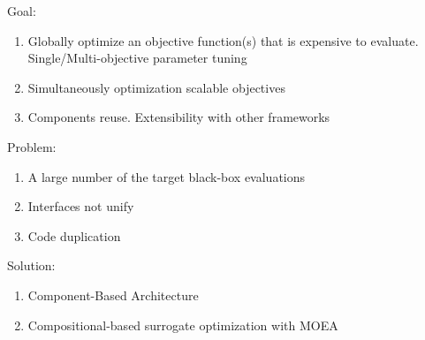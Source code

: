         Goal:
        \begin{enumerate}
            \item Globally optimize an objective function(s) that is expensive to evaluate. Single/Multi-objective parameter tuning
            \item Simultaneously optimization scalable objectives
            \item Components reuse. Extensibility with other frameworks
        \end{enumerate}

        Problem:
        \begin{enumerate}
            \item A large number of the target black-box evaluations
            \item Interfaces not unify
            \item Code duplication
        \end{enumerate}

        Solution:
        \begin{enumerate}
            \item Component-Based Architecture
            \item Compositional-based surrogate optimization with MOEA
        \end{enumerate}
